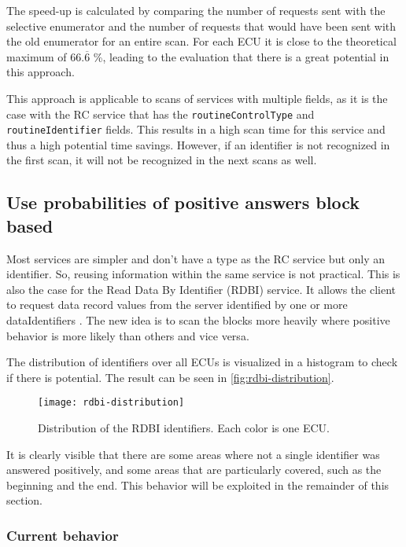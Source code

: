 The speed-up is calculated by comparing the number of requests sent with the selective enumerator and the number of requests that would have been sent with the old enumerator for an entire scan. For each ECU it is close to the theoretical maximum of $66.\overline{6}$ \%, leading to the evaluation that there is a great potential in this approach.

This approach is applicable to scans of services with multiple fields, as it is the case with the RC service that has the \texttt{routineControlType} and \texttt{routineIdentifier} fields. This results in a high scan time for this service and thus a high potential time savings. However, if an identifier is not recognized in the first scan, it will not be recognized in the next scans as well.


\subsection{Use probabilities of positive answers block based}
Most services are simpler and don't have a type as the RC service but only an identifier. So, reusing information within the same service is not practical. This is also the case for the Read Data By Identifier (RDBI) service. It allows the client to request data record values from the server identified by one or more dataIdentifiers \cite{iso14229}. The new idea is to scan the blocks more heavily where positive behavior is more likely than others and vice versa.

The distribution of identifiers over all ECUs is visualized in a histogram to check if there is potential. The result can be seen in \autoref{fig:rdbi-distribution}.

\begin{figure}[h]
    \centering
    \texttt{[image: rdbi-distribution]}
    \caption{Distribution of the RDBI identifiers. Each color is one ECU.}
    \label{fig:rdbi-distribution}
\end{figure}

It is clearly visible that there are some areas where not a single identifier was answered positively, and some areas that are particularly covered, such as the beginning and the end. This behavior will be exploited in the remainder of this section.

\subsubsection{Current behavior}

